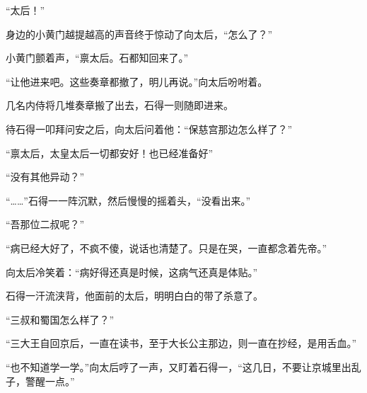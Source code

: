 “太后！”

身边的小黄门越提越高的声音终于惊动了向太后，“怎么了？”

小黄门颤着声，“禀太后。石都知回来了。”

“让他进来吧。这些奏章都撤了，明儿再说。”向太后吩咐着。

几名内侍将几堆奏章搬了出去，石得一则随即进来。

待石得一叩拜问安之后，向太后问着他：“保慈宫那边怎么样了？”

“禀太后，太皇太后一切都安好！也已经准备好”

“没有其他异动？”

“……”石得一一阵沉默，然后慢慢的摇着头，“没看出来。”

“吾那位二叔呢？”

“病已经大好了，不疯不傻，说话也清楚了。只是在哭，一直都念着先帝。”

向太后冷笑着：“病好得还真是时候，这病气还真是体贴。”

石得一汗流浃背，他面前的太后，明明白白的带了杀意了。

“三叔和蜀国怎么样了？”

“三大王自回京后，一直在读书，至于大长公主那边，则一直在抄经，是用舌血。”

“也不知道学一学。”向太后哼了一声，又盯着石得一，“这几日，不要让京城里出乱子，警醒一点。”


